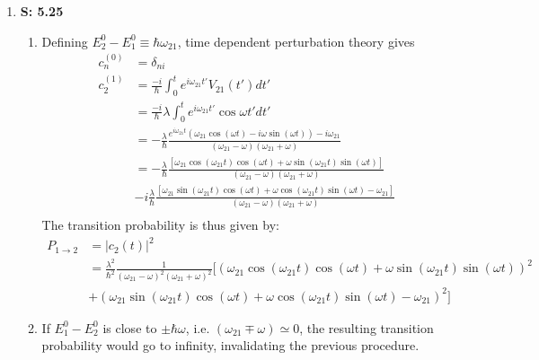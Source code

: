 \documentclass[12pt, letterpaper]{article}
\begin{document}
\begin{enumerate}
    
\item[] \textbf{S: 5.25}
\begin{enumerate}
    
\item
Defining $E_2^0-E_1^0\equiv\hbar\omega_{21}$, time dependent perturbation theory gives
\begin{align}
c_n^{(0)} &= \delta_{ni}\\
c_2^{(1)} &= \frac{-i}{\hbar}\int_0^te^{i\omega_{21}t'}V_{21}(t')dt'\\
&= \frac{-i}{\hbar}\lambda\int_0^te^{i\omega_{21}t'}\cos{\omega t'}dt'\\
&= -\frac{\lambda }{\hbar}\frac{e^{i\omega_{21}t}(\omega_{21}\cos(\omega t)
    -i\omega\sin(\omega t))-i\omega_{21}}{(\omega_{21}-\omega)
    (\omega_{21}+\omega)}\\
&= -\frac{\lambda }{\hbar}\frac{[\omega_{21}\cos{(\omega_{21}t)}\cos{(\omega t)}+\omega\sin{(\omega_{21}t)}\sin{(\omega t)}]}{(\omega_{21}-\omega)(\omega_{21}+\omega)}\\
&-i\frac{\lambda}{\hbar}\frac{[\omega_{21}\sin{(\omega_{21}t)}\cos{(\omega t)}+\omega\cos{(\omega_{21}t)}\sin{(\omega t)}-\omega_{21}]
    }{(\omega_{21}-\omega)(\omega_{21}+\omega)}\\
\end{align}
The transition probability is thus given by:
\begin{align}
P_{1\rightarrow 2}&=|c_2(t)|^2\\
&=\frac{\lambda^2}{\hbar^2}\frac{1}{(\omega_{21}-\omega)^2(\omega_{21}+\omega)^2}[(\omega_{21}\cos{(\omega_{21}t)}\cos{(\omega t)}+\omega\sin{(\omega_{21}t)}\sin{(\omega t)})^2\\
&+(\omega_{21}\sin{(\omega_{21}t)}\cos{(\omega t)}+\omega\cos{(\omega_{21}t)}\sin{(\omega t)}-\omega_{21})^2]
\end{align}

\item If $E_1^0-E_2^0$ is close to $\pm\hbar\omega$, i.e. $(\omega_{21}\mp\omega)\simeq0$, the resulting transition probability would go to infinity, invalidating the previous procedure.

\end{enumerate}

\end{enumerate}
\end{document}
